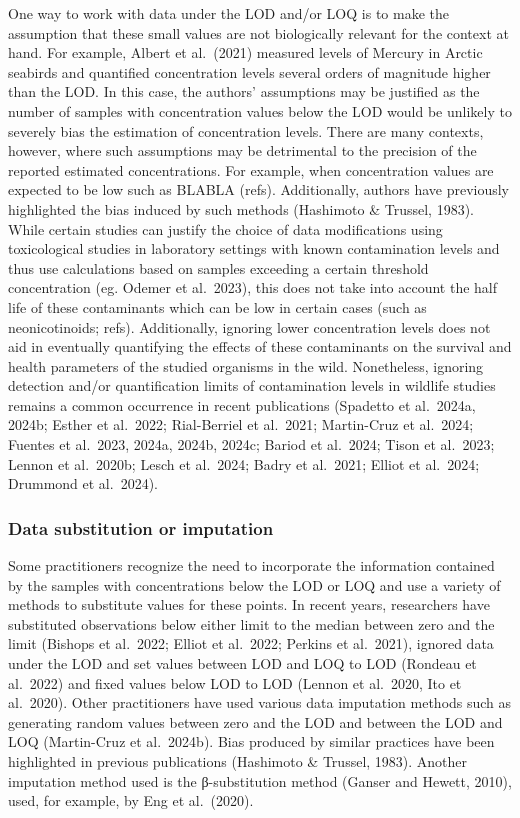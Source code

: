\documentclass[
]{article}
\begin{document}
One way to work with data under the LOD and/or LOQ is to make the
assumption that these small values are not biologically relevant for the
context at hand. For example, Albert et al.~(2021) measured levels of
Mercury in Arctic seabirds and quantified concentration levels several
orders of magnitude higher than the LOD. In this case, the authors'
assumptions may be justified as the number of samples with concentration
values below the LOD would be unlikely to severely bias the estimation
of concentration levels. There are many contexts, however, where such
assumptions may be detrimental to the precision of the reported
estimated concentrations. For example, when concentration values are
expected to be low such as BLABLA (refs). Additionally, authors have
previously highlighted the bias induced by such methods (Hashimoto \&
Trussel, 1983). While certain studies can justify the choice of data
modifications using toxicological studies in laboratory settings with
known contamination levels and thus use calculations based on samples
exceeding a certain threshold concentration (eg. Odemer et al.~2023),
this does not take into account the half life of these contaminants
which can be low in certain cases (such as neonicotinoids; refs).
Additionally, ignoring lower concentration levels does not aid in
eventually quantifying the effects of these contaminants on the survival
and health parameters of the studied organisms in the wild. Nonetheless,
ignoring detection and/or quantification limits of contamination levels
in wildlife studies remains a common occurrence in recent publications
(Spadetto et al.~2024a, 2024b; Esther et al.~2022; Rial-Berriel et
al.~2021; Martin-Cruz et al.~2024; Fuentes et al.~2023, 2024a, 2024b,
2024c; Bariod et al.~2024; Tison et al.~2023; Lennon et al.~2020b; Lesch
et al.~2024; Badry et al.~2021; Elliot et al.~2024; Drummond et
al.~2024).

\subsubsection{Data substitution or
imputation}\label{data-substitution-or-imputation}

Some practitioners recognize the need to incorporate the information
contained by the samples with concentrations below the LOD or LOQ and
use a variety of methods to substitute values for these points. In
recent years, researchers have substituted observations below either
limit to the median between zero and the limit (Bishops et al.~2022;
Elliot et al.~2022; Perkins et al.~2021), ignored data under the LOD and
set values between LOD and LOQ to LOD (Rondeau et al.~2022) and fixed
values below LOD to LOD (Lennon et al.~2020, Ito et al.~2020). Other
practitioners have used various data imputation methods such as
generating random values between zero and the LOD and between the LOD
and LOQ (Martin-Cruz et al.~2024b). Bias produced by similar practices
have been highlighted in previous publications (Hashimoto \& Trussel,
1983). Another imputation method used is the β-substitution method
(Ganser and Hewett, 2010), used, for example, by Eng et al.~(2020).
\end{document}

